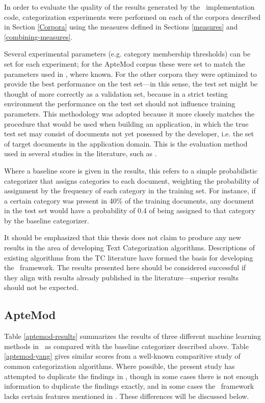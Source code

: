 In order to evaluate the quality of the results generated by the
\aicat\ implementation code, categorization experiments were performed
on each of the corpora described in Section \ref{Corpora} using the
measures defined in Sections \ref{measures} and
\ref{combining-measures}.

Several
experimental parameters (e.g. category membership thresholds) can be
set for each experiment; for the ApteMod corpus these were set to
match the parameters used in \cite{yang:99}, where known.  For the
other corpora they were optimized to provide the
best performance on the test set---in this sense, the test set might
be thought of more correctly as a validation set, because in a strict
testing environment the performance on the test set should not
influence training parameters.  This methodology was adopted because
it more closely matches the procedure that would be used when building
an application, in which the true test set may consist of documents
not yet posessed by the developer, i.e. the set of target documents
in the application domain.  This is the evaluation method used in
several studies in the literature, such as \cite{joachims:98}.

Where a baseline score is given in the results, this refers to a
simple probabilistic categorizer that assigns categories to each
document, weighting the probability of assignment by the frequency of
each category in the training set.  For instance, if a certain
category was present in 40\% of the training documents, any document
in the test set would have a probability of 0.4 of being assigned to
that category by the baseline categorizer.  

It should be emphasized that this thesis does not claim to produce any
new results in the area of developing Text Categorization algorithms.
Descriptions of existing algorithms from the TC literature have formed
the basis for developing the \aicat\ framework.  The results presented
here should be considered successful if they align with results
already published in the literature---superior results should not be
expected.

\subsection{ApteMod}

Table \ref{aptemod-results} summarizes the results of three different
machine learning methods in \aicat\ as compared with the baseline
categorizer described above.  Table \ref{aptemod-yang} gives similar
scores from a well-known comparitive study of common categorization
algorithms. \cite{yang:99} Where possible, the present study has
attempted to duplicate the findings in \cite{yang:99}, though in some
cases there is not enough information to duplicate the findings
exactly, and in some cases the \aicat\ framework lacks certain
features mentioned in \cite{yang:99}.  These differences will be
discussed below.

